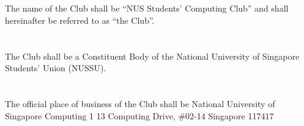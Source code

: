 
\section{}
The name of the Club shall be “NUS Students' Computing Club” and shall hereinafter be referred to as “the Club”.

\section{}
The Club shall be a Constituent Body of the National University of Singapore Students' Union (NUSSU).

\section{}
The official place of business of the Club shall be\newline
\hspace*{24mm}National University of Singapore\newline
\hspace*{24mm}Computing 1\newline
\hspace*{24mm}13 Computing Drive, \#02-14\newline
\hspace*{24mm}Singapore 117417
